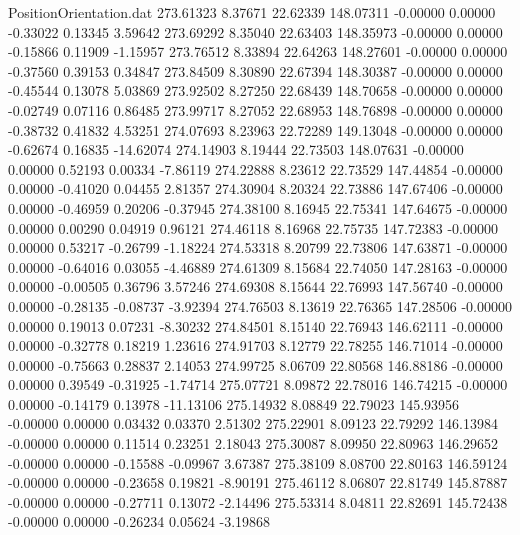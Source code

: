 \begin{filecontents}{PositionOrientation.dat}
 273.61323    8.37671   22.62339   148.07311   -0.00000    0.00000   -0.33022    0.13345    3.59642
 273.69292    8.35040   22.63403   148.35973   -0.00000    0.00000   -0.15866    0.11909   -1.15957
 273.76512    8.33894   22.64263   148.27601   -0.00000    0.00000   -0.37560    0.39153    0.34847
 273.84509    8.30890   22.67394   148.30387   -0.00000    0.00000   -0.45544    0.13078    5.03869
 273.92502    8.27250   22.68439   148.70658   -0.00000    0.00000   -0.02749    0.07116    0.86485
 273.99717    8.27052   22.68953   148.76898   -0.00000    0.00000   -0.38732    0.41832    4.53251
 274.07693    8.23963   22.72289   149.13048   -0.00000    0.00000   -0.62674    0.16835  -14.62074
 274.14903    8.19444   22.73503   148.07631   -0.00000    0.00000    0.52193    0.00334   -7.86119
 274.22888    8.23612   22.73529   147.44854   -0.00000    0.00000   -0.41020    0.04455    2.81357
 274.30904    8.20324   22.73886   147.67406   -0.00000    0.00000   -0.46959    0.20206   -0.37945
 274.38100    8.16945   22.75341   147.64675   -0.00000    0.00000    0.00290    0.04919    0.96121
 274.46118    8.16968   22.75735   147.72383   -0.00000    0.00000    0.53217   -0.26799   -1.18224
 274.53318    8.20799   22.73806   147.63871   -0.00000    0.00000   -0.64016    0.03055   -4.46889
 274.61309    8.15684   22.74050   147.28163   -0.00000    0.00000   -0.00505    0.36796    3.57246
 274.69308    8.15644   22.76993   147.56740   -0.00000    0.00000   -0.28135   -0.08737   -3.92394
 274.76503    8.13619   22.76365   147.28506   -0.00000    0.00000    0.19013    0.07231   -8.30232
 274.84501    8.15140   22.76943   146.62111   -0.00000    0.00000   -0.32778    0.18219    1.23616
 274.91703    8.12779   22.78255   146.71014   -0.00000    0.00000   -0.75663    0.28837    2.14053
 274.99725    8.06709   22.80568   146.88186   -0.00000    0.00000    0.39549   -0.31925   -1.74714
 275.07721    8.09872   22.78016   146.74215   -0.00000    0.00000   -0.14179    0.13978  -11.13106
 275.14932    8.08849   22.79023   145.93956   -0.00000    0.00000    0.03432    0.03370    2.51302
 275.22901    8.09123   22.79292   146.13984   -0.00000    0.00000    0.11514    0.23251    2.18043
 275.30087    8.09950   22.80963   146.29652   -0.00000    0.00000   -0.15588   -0.09967    3.67387
 275.38109    8.08700   22.80163   146.59124   -0.00000    0.00000   -0.23658    0.19821   -8.90191
 275.46112    8.06807   22.81749   145.87887   -0.00000    0.00000   -0.27711    0.13072   -2.14496
 275.53314    8.04811   22.82691   145.72438   -0.00000    0.00000   -0.26234    0.05624   -3.19868

\end{filecontents}
